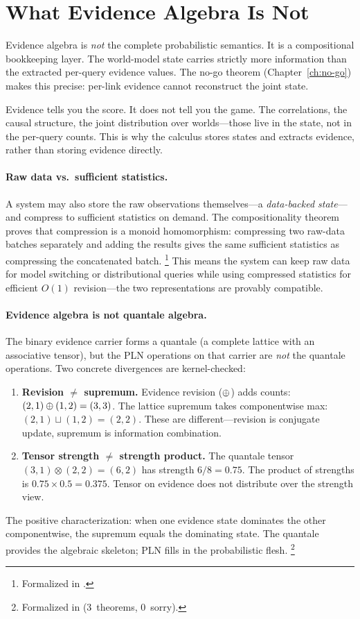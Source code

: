 \documentclass[11pt,openany]{report}
\begin{document}
\section{What Evidence Algebra Is Not}

Evidence algebra is \emph{not} the complete probabilistic semantics.
It is a compositional bookkeeping layer.  The world-model state
carries strictly more information than the extracted per-query evidence
values.  The no-go theorem (Chapter~\ref{ch:no-go}) makes this
precise: per-link evidence cannot reconstruct the joint state.

Evidence tells you the score.  It does not tell you the game.
The correlations, the causal structure, the joint distribution over
worlds---those live in the state, not in the per-query counts.  This
is why the calculus stores states and extracts evidence, rather than
storing evidence directly.

\paragraph{Raw data vs.\ sufficient statistics.}
A system may also store the raw observations themselves---a
\emph{data-backed state}---and compress to sufficient statistics
on demand.  The compositionality theorem
 proves that compression is a monoid
homomorphism: compressing two raw-data batches separately and
adding the results gives the same sufficient statistics as
compressing the concatenated batch.%
\footnote{Formalized in
.}
This means the system can keep raw data for model switching or
distributional queries while using compressed statistics for
efficient $O(1)$ revision---the two representations are provably
compatible.

\paragraph{Evidence algebra is not quantale algebra.}
The binary evidence carrier forms a quantale (a complete lattice
with an associative tensor), but the PLN operations on that
carrier are \emph{not} the quantale operations.  Two concrete
divergences are kernel-checked:
\begin{enumerate}
\item \textbf{Revision $\neq$ supremum.}  Evidence revision
  ($\oplus$) adds counts: $(2,1) \oplus (1,2) = (3,3)$.  The
  lattice supremum takes componentwise max: $(2,1) \sqcup (1,2) =
  (2,2)$.  These are different---revision is conjugate update,
  supremum is information combination.
\item \textbf{Tensor strength $\neq$ strength product.}  The
  quantale tensor $(3,1) \otimes (2,2) = (6,2)$ has strength
  $6/8 = 0.75$.  The product of strengths is $0.75 \times 0.5 =
  0.375$.  Tensor on evidence does not distribute over the
  strength view.
\end{enumerate}
The positive characterization: when one evidence state dominates
the other componentwise, the supremum equals the dominating
state.  The quantale provides the algebraic skeleton; PLN fills
in the probabilistic flesh.%
\footnote{Formalized in
(3~theorems, 0~sorry).}
\end{document}
